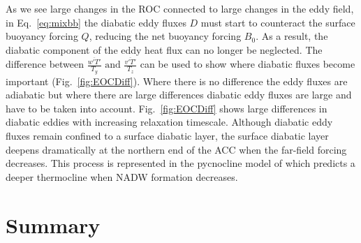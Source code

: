 As we see large changes in the ROC connected to large changes in the eddy field, in Eq.~\ref{eq:mixbb} the diabatic eddy fluxes $D$ must start to counteract the surface buoyancy forcing $Q$, reducing the net buoyancy forcing $B_0$. As a result, the diabatic component of the eddy heat flux can no longer be neglected. The difference between $\displaystyle{\frac{\overline{w'T'}}{T_y} \text{ and } \frac{\overline{v'T'}}{T_z}}$ can be used to show where diabatic fluxes become important (Fig.~\ref{fig:EOCDiff}). Where there is no difference the eddy fluxes are adiabatic but where there are large differences diabatic eddy fluxes are large and have to be taken into account. Fig.~\ref{fig:EOCDiff} shows large differences in diabatic eddies with increasing relaxation timescale. Although diabatic eddy fluxes remain confined to a surface diabatic layer, the surface diabatic layer deepens dramatically at the northern end of the ACC when the far-field forcing decreases. This process is represented in the pycnocline model of \cite{g99} which predicts a deeper thermocline when NADW formation decreases. 

\section{Summary}

